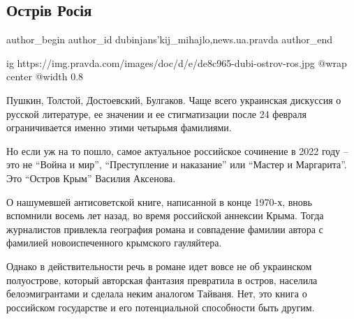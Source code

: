  
 
 
 
 
 
\subsection{Острів Росія}
\label{sec:14_05_2022.stz.news.ua.pravda.1.ostriv_rosia}
 
\ifcmt
 author_begin
   author_id dubinjans'kij_mihajlo,news.ua.pravda
 author_end
\fi

\ifcmt
  ig https://img.pravda.com/images/doc/d/e/de8c965-dubi-ostrov-ros.jpg
  @wrap center
  @width 0.8
\fi

Пушкин, Толстой, Достоевский, Булгаков. Чаще всего украинская дискуссия о
русской литературе, ее значении и ее стигматизации после 24 февраля
ограничивается именно этими четырьмя фамилиями.

Но если уж на то пошло, самое актуальное российское сочинение в 2022 году – это
не \enquote{Война и мир}, \enquote{Преступление и наказание} или
\enquote{Мастер и Маргарита}. Это \enquote{Остров Крым} Василия Аксенова.

О нашумевшей антисоветской книге, написанной в конце 1970-х, вновь вспомнили
восемь лет назад, во время российской аннексии Крыма. Тогда журналистов
привлекла география романа и совпадение фамилии автора с фамилией
новоиспеченного крымского гауляйтера.

Однако в действительности речь в романе идет вовсе не об украинском
полуострове, который авторская фантазия превратила в остров, населила
белоэмигрантами и сделала неким аналогом Тайваня. Нет, это книга о российском
государстве и его потенциальной способности быть другим.

\begin{aanagolos}
  
\end{aanagolos}
